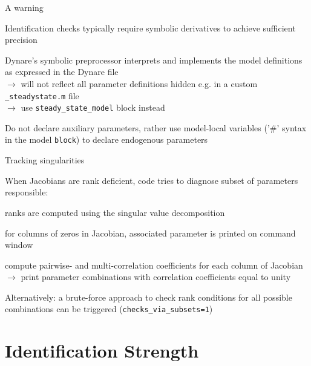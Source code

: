 \documentclass[handout,usepdftitle=false,xcolor=dvipsnames,aspectratio=169]{beamer}
\begin{document}
\begin{frame}{A warning}

  \begin{witemize}
    \item Identification checks typically require symbolic derivatives to achieve sufficient precision
    \item Dynare's symbolic preprocessor interprets and implements the model definitions as expressed in the Dynare file\\
    $\rightarrow$ will not reflect all parameter definitions hidden e.g. in a custom \texttt{\_steadystate.m} file \\
    $\rightarrow$ use \texttt{steady\_state\_model} block instead
    \item Do not declare auxiliary parameters, rather use model-local variables ('\#' syntax in the
    model \texttt{block}) to declare endogenous parameters
  \end{witemize}
\end{frame}

\begin{frame}{Tracking singularities}

  \begin{witemize}
    \item When Jacobians are rank deficient, code tries to diagnose subset of parameters responsible:
    \begin{witemize}
      \item ranks are computed using the singular value decomposition
      \item for columns of zeros in Jacobian, associated parameter is printed on command window
      \item compute pairwise- and multi-correlation coefficients for each column of Jacobian\\
      $\rightarrow$ print parameter combinations with correlation coefficients equal to unity
    \end{witemize}
    \item Alternatively: a brute-force approach to check rank conditions for all possible combinations
    can be triggered (\texttt{checks\_via\_subsets=1})
  \end{witemize}
\end{frame}

\section{Identification Strength}
\end{document}
